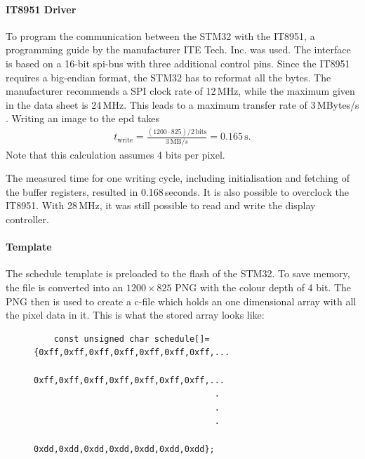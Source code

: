\paragraph{IT8951 Driver}
To program the communication between the STM32 with the IT8951, a programming guide by the manufacturer ITE Tech. Inc. was used.
The interface is based on a 16-bit \acs{spi}-bus with three additional control pins. Since the IT8951 requires a big-endian format, the STM32 has to reformat all the bytes. 
The manufacturer recommends a SPI clock rate of 12\,MHz, while the maximum given in the data sheet is 24\,MHz.
This leads to a maximum transfer rate of 3\,MBytes/s  \cite{IT8951}. 
Writing an image to the \acs{epd} takes  
\begin{align}
	t_{\text{write}}=\frac{(1200\cdot 825)/2\,\text{bits}}{3\,\text{MB}/s}=0.165\,\text{s}.
\end{align}
Note that this calculation assumes 4 bits per pixel.

The measured time for one writing cycle, including initialisation and fetching of the buffer registers, resulted in 0.168\,seconds. It is also possible to overclock the IT8951.
With 28\,MHz, it was still possible to read and write the display controller.      

\clearpage
\paragraph{Template}
The schedule template is preloaded to the flash of the STM32. To save memory, the file is converted into an $1200 \times 825$ PNG with the colour depth of 4 bit. The PNG then is used to create a c-file which holds an one dimensional array with all the pixel data in it.
This is what the stored array looks like:
\begin{figure}[ht]
	\begin{lstlisting}
	const unsigned char schedule[]={0xff,0xff,0xff,0xff,0xff,0xff,0xff,...
									0xff,0xff,0xff,0xff,0xff,0xff,0xff,...
									.
									.
									.
									0xdd,0xdd,0xdd,0xdd,0xdd,0xdd,0xdd};
	\end{lstlisting}
\end{figure}

